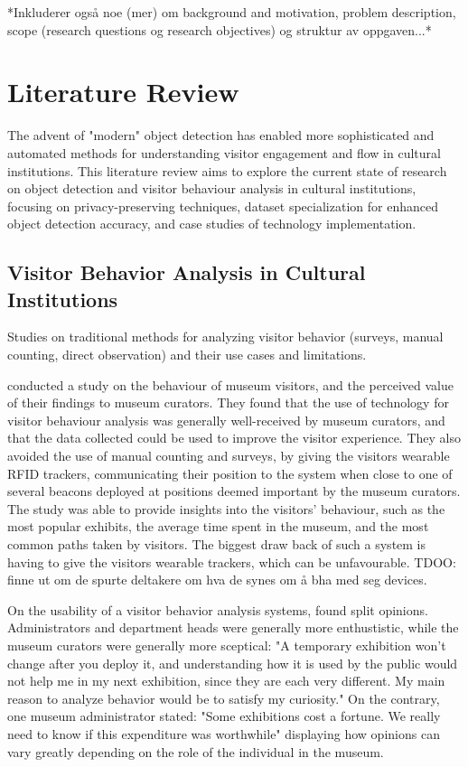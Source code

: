*Inkluderer også noe (mer) om background and motivation, problem description, scope (research questions og research objectives) og struktur av oppgaven...*

\section{Literature Review}
The advent of "modern" object detection has enabled more sophisticated and automated methods for understanding visitor engagement and flow in cultural institutions. This literature review aims to explore the current state of research on object detection and visitor behaviour analysis in cultural institutions, focusing on privacy-preserving techniques, dataset specialization for enhanced object detection accuracy, and case studies of technology implementation. 

\subsection{Visitor Behavior Analysis in Cultural Institutions}
Studies on traditional methods for analyzing visitor behavior (surveys, manual counting, direct observation) and their use cases and limitations.



\citeauthor{la2017museumbehaviouranalysis} conducted a study on the behaviour of museum visitors, and the perceived value of their findings to museum curators. They found that the use of technology for visitor behaviour analysis was generally well-received by museum curators, and that the data collected could be used to improve the visitor experience. They also avoided the use of manual counting and surveys, by giving the visitors wearable RFID trackers, communicating their position to the system when close to one of several beacons deployed at positions deemed important by the museum curators. The study was able to provide insights into the visitors' behaviour, such as the most popular exhibits, the average time spent in the museum, and the most common paths taken by visitors. The biggest draw back of such a system is having to give the visitors wearable trackers, which can be unfavourable. TDOO: finne ut om de spurte deltakere om hva de synes om å bha med seg devices.

On the usability of a visitor behavior analysis systems, \citeauthor{la2017museumbehaviouranalysis} found split opinions. Administrators and department heads were generally more enthustistic, while the museum curators were generally more sceptical: "A temporary exhibition won’t
change after you deploy it, and understanding how it is used by the public would not help me in my next exhibition, since they are each very different. My main reason to analyze behavior would be to satisfy my curiosity." On the contrary, one museum administrator stated: "Some exhibitions cost a fortune. We really need to know if this expenditure was worthwhile" displaying how opinions can vary greatly depending on the role of the individual in the museum.



